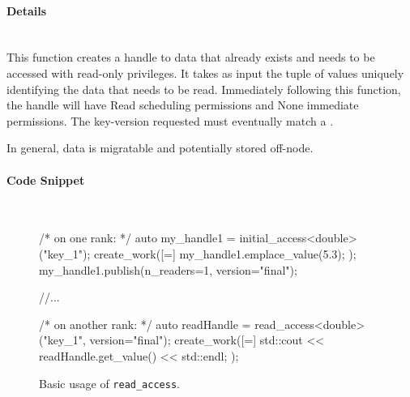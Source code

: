 \paragraph{Details}\mbox{}\\
This function creates a handle to data that already exists and 
needs to be accessed with read-only privileges. 
It takes as input the tuple of values uniquely 
identifying the data that needs to be read.
Immediately following this function, the handle will have Read scheduling permissions
and None immediate permissions.
The key-version requested must eventually match a .

In general,  data is migratable and potentially stored off-node.

\paragraph{Code Snippet}\mbox{}\\
\begin{figure}[!h]
\begin{CppCodeNumb}
/* on one rank: */
auto my_handle1 = initial_access<double>("key_1");
create_work([=]{
  my_handle1.emplace_value(5.3);
});
my_handle1.publish(n_readers=1, version="final");

//...

/* on another rank: */
auto readHandle = read_access<double>("key_1", version="final");
create_work([=]{
  std::cout << readHandle.get_value() << std::endl;
});
\end{CppCodeNumb}
\label{fig:fe_api_readaccess}
\caption{Basic usage of \texttt{read\_access}.}
\end{figure}



